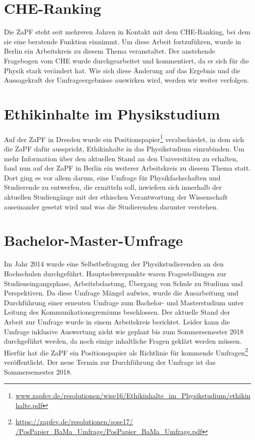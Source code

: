 \documentclass[a4paper]{article}
\begin{document}
\section*{CHE-Ranking} 
Die  ZaPF steht seit mehreren Jahren in Kontakt mit dem CHE-Ranking, bei dem
sie eine beratende Funktion einnimmt. Um diese Arbeit fortzuführen, wurde in
Berlin ein Arbeitskreis zu  diesem Thema veranstaltet. Der anstehende
Fragebogen vom CHE wurde durchgearbeitet und kommentiert, da er sich für die
Physik stark verändert hat. Wie sich diese Änderung auf das Ergebnis und die
Aussagekraft der Umfrageergebnisse auswirken wird, werden wir weiter verfolgen.

\section*{Ethikinhalte im Physikstudium}
Auf der ZaPF in Dresden wurde ein
Positionspapier\footnote{\href{https://zapfev.de/resolutionen/wise16/Ethikinhalte_im_Physikstudium/ethikinhalte.pdf}{\url{www.zapfev.de/resolutionen/wise16/Ethikinhalte_im_Physikstudium/ethikinhalte.pdf}}}
verabschiedet, in dem sich die ZaPF dafür ausspricht, Ethikinhalte in das
Physikstudium einzubinden.  Um  mehr Information über den aktuellen Stand an
den Universitäten zu  erhalten, fand nun auf der ZaPF in Berlin ein weiterer
Arbeitskreis zu  diesem Thema statt. Dort ging es vor allem darum, eine Umfrage
für  Physikfachschaften und Studierende zu entwerfen, die ermitteln soll,
inwiefern  sich innerhalb der aktuellen Studiengänge mit der ethischen
Verantwortung der Wissenschaft auseinander gesetzt wird und was die
Studierenden darunter verstehen.

\section*{Bachelor-Master-Umfrage}
Im  Jahr 2014 wurde eine Selbstbefragung der Physikstudierenden an den
Hochschulen durchgeführt. Hauptschwerpunkte waren Fragestellungen zur
Studieneingangsphase, Arbeitsbelastung,  Übergang von Schule zu Studium und
Perspektiven. Da diese  Umfrage Mängel aufwies, wurde die Ausarbeitung und
Durchführung einer erneuten Umfrage zum Bachelor- und Masterstudium unter
Leitung des Kommunikationsgremiums beschlossen. Der  aktuelle Stand der Arbeit
zur Umfrage wurde in einem Arbeitskreis berichtet. Leider kann die Umfrage
inklusive Auswertung nicht wie geplant bis zum Sommersemester 2018
durchgeführt werden, da noch einige inhaltliche Fragen geklärt werden müssen.
Hierfür hat die ZaPF ein Positionspapier  als Richtlinie für kommende
Umfragen\footnote{\href{https://zapfev.de/resolutionen/sose17//PosPapier_BaMa_Umfrage/PosPapier_BaMa_Umfrage.pdf}{\url{https://zapfev.de/resolutionen/sose17/
/PosPapier_BaMa_Umfrage/PosPapier_BaMa_Umfrage.pdf}}} veröffentlicht. Der neue
Termin zur Durchführung der Umfrage ist das Sommersemester 2018.
\end{document}
